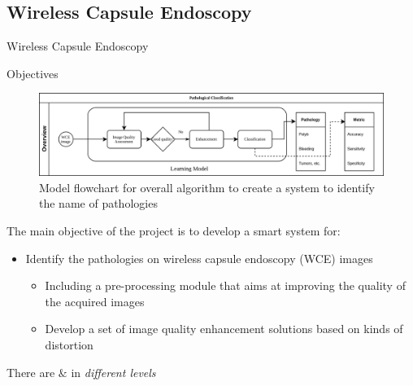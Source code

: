 \documentclass{libs/ufc_format}
\begin{document}
\subsection{Wireless Capsule Endoscopy}
\begin{frame}{Wireless Capsule Endoscopy}


    \pause


\end{frame}

\begin{frame}{Objectives}
    \begin{figure}
        \includegraphics[scale=0.2]{libs/overallalgo.png}
        \caption{Model flowchart for overall algorithm to create a system to identify the name of pathologies}
        \label{fig:overallalgo}
    \end{figure}
    The main objective of the project is to develop a smart system for:
    \begin{itemize}
        \item Identify the pathologies on wireless capsule endoscopy (WCE) images
              \begin{itemize}
                  \item Including a pre-processing module that aims at improving the quality of the acquired images
                  \item Develop a set of image quality enhancement solutions based on kinds of distortion
              \end{itemize}


    \end{itemize}

    \vspace{0.2cm}

    There are  $\&$ in \emph{different levels}
\end{frame}
\end{document}
